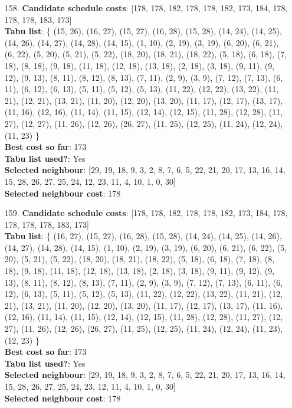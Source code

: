 \documentclass[fleqn]{article}
\begin{document}
\begin{itemize}
    \item[158.] \textbf{Candidate schedule costs}: [178, 178, 182, 178, 178, 182, 173, 184, 178, 178, 178, 183, 173] \\
    \textbf{Tabu list}: \{ (15, 26), (16, 27), (15, 27), (16, 28), (15, 28), (14, 24), (14, 25), (14, 26), (14, 27), (14, 28), (14, 15), (1, 10), (2, 19), (3, 19), (6, 20), (6, 21), (6, 22), (5, 20), (5, 21), (5, 22), (18, 20), (18, 21), (18, 22), (5, 18), (6, 18), (7, 18), (8, 18), (9, 18), (11, 18), (12, 18), (13, 18), (2, 18), (3, 18), (9, 11), (9, 12), (9, 13), (8, 11), (8, 12), (8, 13), (7, 11), (2, 9), (3, 9), (7, 12), (7, 13), (6, 11), (6, 12), (6, 13), (5, 11), (5, 12), (5, 13), (11, 22), (12, 22), (13, 22), (11, 21), (12, 21), (13, 21), (11, 20), (12, 20), (13, 20), (11, 17), (12, 17), (13, 17), (11, 16), (12, 16), (11, 14), (11, 15), (12, 14), (12, 15), (11, 28), (12, 28), (11, 27), (12, 27), (11, 26), (12, 26), (26, 27), (11, 25), (12, 25), (11, 24), (12, 24), (11, 23) \} \\
    \textbf{Best cost so far}: 173 \\
    \textbf{Tabu list used?}: Yes \\
    \textbf{Selected neighbour}: [29, 19, 18, 9, 3, 2, 8, 7, 6, 5, 22, 21, 20, 17, 13, 16, 14, 15, 28, 26, 27, 25, 24, 12, 23, 11, 4, 10, 1, 0, 30] \\
    \textbf{Selected neighbour cost}: 178
      

    \item[159.] \textbf{Candidate schedule costs}: [178, 178, 182, 178, 178, 182, 173, 184, 178, 178, 178, 178, 183, 173] \\
    \textbf{Tabu list}: \{ (16, 27), (15, 27), (16, 28), (15, 28), (14, 24), (14, 25), (14, 26), (14, 27), (14, 28), (14, 15), (1, 10), (2, 19), (3, 19), (6, 20), (6, 21), (6, 22), (5, 20), (5, 21), (5, 22), (18, 20), (18, 21), (18, 22), (5, 18), (6, 18), (7, 18), (8, 18), (9, 18), (11, 18), (12, 18), (13, 18), (2, 18), (3, 18), (9, 11), (9, 12), (9, 13), (8, 11), (8, 12), (8, 13), (7, 11), (2, 9), (3, 9), (7, 12), (7, 13), (6, 11), (6, 12), (6, 13), (5, 11), (5, 12), (5, 13), (11, 22), (12, 22), (13, 22), (11, 21), (12, 21), (13, 21), (11, 20), (12, 20), (13, 20), (11, 17), (12, 17), (13, 17), (11, 16), (12, 16), (11, 14), (11, 15), (12, 14), (12, 15), (11, 28), (12, 28), (11, 27), (12, 27), (11, 26), (12, 26), (26, 27), (11, 25), (12, 25), (11, 24), (12, 24), (11, 23), (12, 23) \} \\
    \textbf{Best cost so far}: 173 \\
    \textbf{Tabu list used?}: Yes \\
    \textbf{Selected neighbour}: [29, 19, 18, 9, 3, 2, 8, 7, 6, 5, 22, 21, 20, 17, 13, 16, 14, 15, 28, 26, 27, 25, 24, 23, 12, 11, 4, 10, 1, 0, 30] \\
    \textbf{Selected neighbour cost}: 178
      


\end{itemize}
\end{document}
